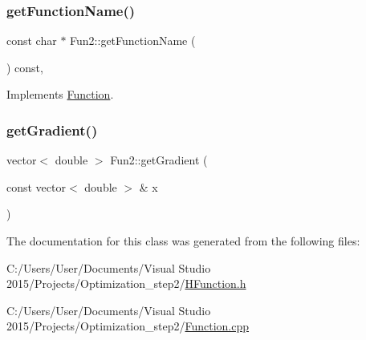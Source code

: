 \subsubsection{\texorpdfstring{get\+Function\+Name()}{getFunctionName()}}
{\footnotesize\ttfamily const char $\ast$ Fun2\+::get\+Function\+Name (\begin{DoxyParamCaption}{ }\end{DoxyParamCaption}) const\hspace{0.3cm}{\ttfamily [override]}, {\ttfamily [virtual]}}



Implements \hyperlink{class_function_ab19392e324813377fc6171bf354c24fb}{Function}.

\mbox{\label{class_fun2_adf2435fbf6e848c1ffa2a2287b489a45}} 
\subsubsection{\texorpdfstring{get\+Gradient()}{getGradient()}}
{\footnotesize\ttfamily vector$<$ double $>$ Fun2\+::get\+Gradient (\begin{DoxyParamCaption}\item[{const vector$<$ double $>$ \&}]{x }\end{DoxyParamCaption})\hspace{0.3cm}{\ttfamily [virtual]}}



The documentation for this class was generated from the following files\+:\begin{DoxyCompactItemize}
\item 
C\+:/\+Users/\+User/\+Documents/\+Visual Studio 2015/\+Projects/\+Optimization\+\_\+step2/\hyperlink{_h_function_8h}{H\+Function.\+h}\item 
C\+:/\+Users/\+User/\+Documents/\+Visual Studio 2015/\+Projects/\+Optimization\+\_\+step2/\hyperlink{_function_8cpp}{Function.\+cpp}\end{DoxyCompactItemize}
